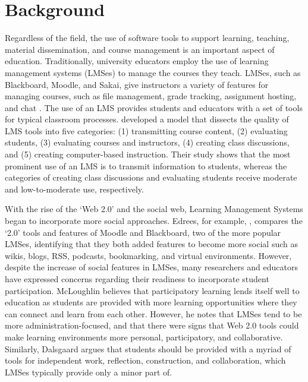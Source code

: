 



\section{Background}
Regardless of the field, the use of software tools to support learning, teaching, material dissemination, and course management is an important aspect of education. Traditionally, university educators employ the use of learning management systems (LMSes) to manage the courses they teach. LMSes, such as Blackboard, Moodle, and Sakai, give instructors a variety of features for managing courses, such as file management, grade tracking, assignment hosting, and chat \cite{kumar2011comparative}. The use of an LMS provides students and educators with a set of tools for typical classroom processes. \cite{malikowski2007model} developed a model that dissects the quality of LMS tools into five categories: (1) transmitting course content, (2) evaluating students, (3) evaluating courses and instructors, (4) creating class discussions, and (5) creating computer-based instruction. Their study shows that the most prominent use of an LMS is to transmit information to students, whereas the categories of creating class discussions and evaluating students receive moderate and low-to-moderate use, respectively.

With the rise of the `Web 2.0' and the social web, Learning Management Systems began to incorporate more social approaches. Edrees, for example, \cite{edrees2013elearning}, compares the `2.0' tools and features of Moodle and Blackboard, two of the more popular LMSes, identifying that they both added features to become more social such as wikis, blogs, RSS, podcasts, bookmarking, and virtual environments. However, despite the increase of social features in LMSes, many researchers and educators have expressed concerns regarding their readiness to incorporate student participation. McLoughlin \cite{mcloughlin2007social} believes that participatory learning lends itself well to education as students are provided with more learning opportunities where they can connect and learn from each other. However, he notes that LMSes tend to be more administration-focused, and that there were signs that Web 2.0 tools could make learning environments more personal, participatory, and collaborative. Similarly, Dalsgaard \cite{dalsgaard2006social} argues that students should be provided with a myriad of tools for independent work, reflection, construction, and collaboration, which LMSes typically provide only a minor part of.

